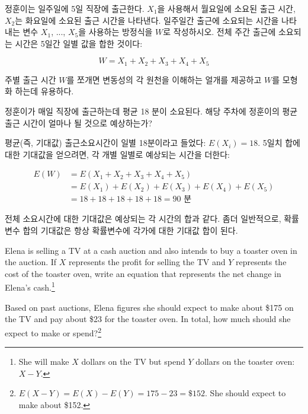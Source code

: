 \begin{example}{정훈이는 일주일에 5일 직장에 출근한다. $X_1$을 사용해서 월요일에 소요된 출근 시간, $X_2$는 화요일에 소요된 출근 시간을 나타낸다. 일주일간 출근에 소요되는 시간을 나타내는 변수 $X_1$, ..., $X_5$을 사용하는 방정식을 $W$로 작성하시오.}
전체 주간 출근에 소요되는 시간은 5일간 일별 값을 합한 것이다:

$$ W = X_1 + X_2 + X_3 + X_4 + X_5 $$

주별 출근 시간 $W$를 쪼개면 변동성의 각 원천을 이해하는 얼개를 제공하고 $W$를 모형화 하는데 유용하다.
\end{example}

\begin{example}{정훈이가 매일 직장에 출근하는데 평균 18 분이 소요된다. 해당 주차에 정훈이의 평균 출근 시간이 얼마나 될 것으로 예상하는가?}

평균(즉, 기대값) 출근소요시간이 일별 18분이라고 들었다: $E(X_i) = 18$. 5일치 합에 대한 기대값을 얻으려면, 각 개별 일별로 예상되는 시간을 더한다:

\begin{align*}
E(W) &= E(X_1 + X_2 + X_3 + X_4 + X_5) \\
	&= E(X_1) + E(X_2) + E(X_3) + E(X_4) + E(X_5) \\
	&= 18 + 18 + 18 + 18 + 18 = 90\text{ 분}
\end{align*}

전체 소요시간에 대한 기대값은 예상되는 각 시간의 합과 같다. 좀더 일반적으로, 확률변수 합의 기대값은 항상 확률변수에 각가에 대한 기대값 합이 된다.
\end{example}

\begin{exercise} \label{elenaIsSellingATVAndBuyingAToasterOvenAtAnAuction}
Elena is selling a TV at a cash auction and also intends to buy a toaster oven in the auction. If $X$ represents the profit for selling the TV and $Y$ represents the cost of the toaster oven, write an equation that represents the net change in Elena's cash.\footnote{She will make $X$ dollars on the TV but spend $Y$ dollars on the toaster oven: $X-Y$.}
\end{exercise}

\begin{exercise}
Based on past auctions, Elena figures she should expect to make about \$175 on the TV and pay about \$23 for the toaster oven. In total, how much should she expect to make or spend?\footnote{$E(X-Y) = E(X) - E(Y) = 175 - 23 = \$152$. She should expect to make about \$152.}
\end{exercise}

